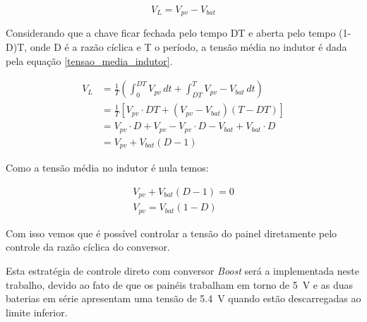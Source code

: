 \begin{equation} \label{tensao_indutor_segunda_etapa}
V_{L} = V_{pv} - V_{bat}
\end{equation}

Considerando que a chave ficar fechada pelo tempo DT e aberta pelo tempo (1-D)T, onde D é a razão cíclica e T o período, a tensão média no indutor é dada pela equação \ref{tensao_media_indutor}.

\begin{equation} \label{tensao_media_indutor}
\begin{aligned}
V_{L} &= \frac{1}{T}\left(\int_{0}^{DT} V_{pv}\,dt + \int_{DT}^{T} V_{pv} - V_{bat}\,dt\right) \\
&= \frac{1}{T}\left[V_{pv}\cdot DT + (V_{pv}-V_{bat})(T-DT)\right] \\
&= V_{pv}\cdot D + V_{pv} - V_{pv}\cdot D - V_{bat} +V_{bat}\cdot D \\
&= V_{pv} + V_{bat}(D-1)
\end{aligned}
\end{equation}

Como a tensão média no indutor é nula temos:

\begin{equation}
\begin{gathered}
V_{pv} + V_{bat}(D-1) = 0 \\
V_{pv} = V_{bat}(1-D) 
\end{gathered}
\end{equation}

Com isso vemos que é possível controlar a tensão do painel diretamente pelo controle da razão cíclica do conversor.

Esta estratégia de controle direto com conversor \textit{Boost} será a implementada neste trabalho, devido ao fato de que os painéis trabalham em torno de \SI{5}{\volt} e as duas baterias em série apresentam uma tensão de \SI{5,4}{\volt} quando estão descarregadas ao limite inferior.